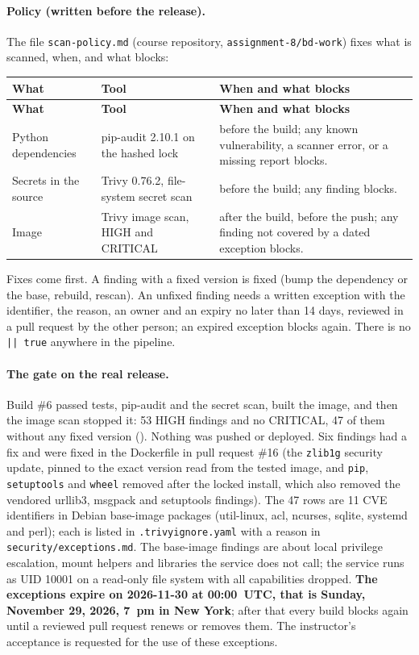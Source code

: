 \paragraph{Policy (written before the release).} The file \texttt{scan-policy.md} (course repository, \texttt{assignment-8/bd-work}) fixes what is scanned, when, and what blocks:
\begin{tabularx}{\linewidth}{L{3.2cm}L{3.2cm}Y}
\caption{Scan policy\label{Table:ScanPolicy}}\\
\toprule \textbf{What} & \textbf{Tool} & \textbf{When and what blocks}\\ \midrule
\endfirsthead
\toprule \textbf{What} & \textbf{Tool} & \textbf{When and what blocks}\\ \midrule
\endhead \bottomrule \endlastfoot
Python dependencies & pip-audit 2.10.1 on the hashed lock & before the build; any known vulnerability, a scanner error, or a missing report blocks.\\
Secrets in the source & Trivy 0.76.2, file-system secret scan & before the build; any finding blocks.\\
Image & Trivy image scan, HIGH and CRITICAL & after the build, before the push; any finding not covered by a dated exception blocks.\\
\end{tabularx}
Fixes come first. A finding with a fixed version is fixed (bump the dependency or the base, rebuild, rescan). An unfixed finding needs a written exception with the identifier, the reason, an owner and an expiry no later than 14 days,
reviewed in a pull request by the other person; an expired exception blocks again. There is no \texttt{|| true} anywhere in the pipeline.

\paragraph{The gate on the real release.} Build \#6 passed tests, pip-audit and the secret scan, built the image, and then the image scan stopped it: 53 HIGH findings and no CRITICAL, 47 of them without any fixed version ().
Nothing was pushed or deployed. Six findings had a fix and were fixed in the Dockerfile in pull request \#16 (the \texttt{zlib1g} security update, pinned to the exact version read from the tested image, and \texttt{pip}, \texttt{setuptools} and \texttt{wheel} removed
after the locked install, which also removed the vendored urllib3, msgpack and setuptools findings). The 47 rows are 11 CVE identifiers in Debian base-image packages (util-linux, acl, ncurses, sqlite, systemd and perl); each is listed in \texttt{.trivyignore.yaml}
with a reason in \texttt{security/exceptions.md}. The base-image findings are about local privilege escalation, mount helpers and libraries the service does not call; the service runs as UID 10001 on a read-only file system with all capabilities dropped.
\textbf{The exceptions expire on 2026-11-30 at 00:00~UTC, that is Sunday, November 29, 2026, 7~pm in New York}; after that every build blocks again until a reviewed pull request renews or removes them. The instructor's acceptance is requested for the use of these exceptions.

